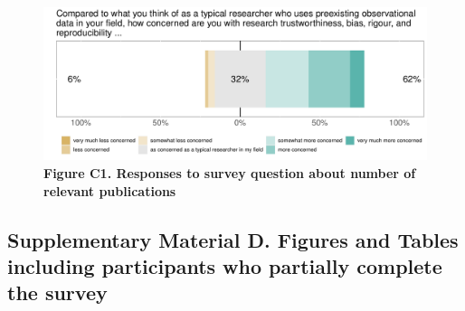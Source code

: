 \documentclass[
  man,floatsintext]{apa6}
\begin{document}
\begin{table}[H]

\caption{\label{tab:languageTable}\textbf{Table C1. ``What programming language or software do you use for your analyses of preexisting observational data? (you may select multiple answers)''}}
\end{table}



\begin{figure}

{\centering \includegraphics[width=1\linewidth]{figs/concernedPlot-1} 

}

\caption{\textbf{Figure C1. Responses to survey question about number of relevant publications}}\label{fig:concernedPlot}
\end{figure}



\hypertarget{supplementary-material-d.-figures-and-tables-including-participants-who-partially-complete-the-survey}{%
\subsection{Supplementary Material D. Figures and Tables including participants who partially complete the survey}\label{supplementary-material-d.-figures-and-tables-including-participants-who-partially-complete-the-survey}}
\end{document}
